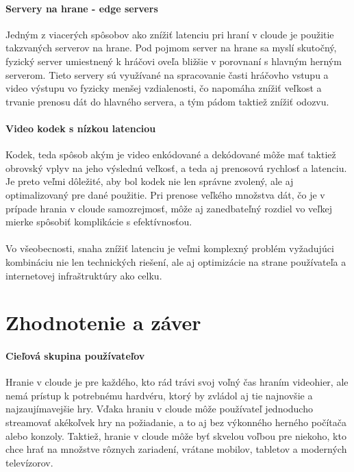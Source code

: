 \documentclass[10pt,twoside,slovak,a4paper]{article}
\begin{document}
\paragraph{Servery na hrane - edge servers} Jedným z viacerých spôsobov ako znížiť latenciu pri hraní v cloude je použitie takzvaných serverov na hrane. Pod pojmom server na hrane sa myslí skutočný, fyzický server umiestnený k hráčovi oveľa bližšie v porovnaní s hlavným herným serverom. Tieto servery sú využívané na spracovanie časti hráčovho vstupu a video výstupu vo fyzicky menšej vzdialenosti, čo napomáha znížiť veľkost a trvanie prenosu dát do hlavného servera, a tým pádom taktiež znížiť odozvu. \cite{8289317}

\paragraph{Video kodek s nízkou latenciou} Kodek, teda spôsob akým je video enkódované a dekódované môže mať taktiež obrovský vplyv na jeho výslednú veľkosť, a teda aj prenosovú rychlosť a latenciu. Je preto veľmi dôležité, aby bol kodek nie len správne zvolený, ale aj optimalizovaný pre dané použitie. Pri prenose veľkého množstva dát, čo je v prípade hrania v cloude samozrejmosť, môže aj zanedbateľný rozdiel vo veľkej mierke spôsobiť komplikácie s efektívnosťou.

\paragraph{} Vo všeobecnosti, snaha znížiť latenciu je veľmi komplexný problém vyžadujúci kombináciu nie len technických riešení, ale aj optimizácie na strane používateľa a internetovej infraštruktúry ako celku.



\section{Zhodnotenie a záver}

\paragraph{Cieľová skupina používateľov} Hranie v cloude je pre každého, kto rád trávi svoj voľný čas hraním videohier, ale nemá prístup k potrebnému hardvéru, ktorý by zvládol aj tie najnovšie a najzaujímavejšie hry. Vďaka hraniu v cloude môže používateľ jednoducho streamovať akékoľvek hry na požiadanie, a to aj bez výkonného herného počítača alebo konzoly. Taktiež, hranie v cloude môže byť skvelou voľbou pre niekoho, kto chce hrať na množstve rôznych zariadení, vrátane mobilov, tabletov a moderných televízorov.
\end{document}

